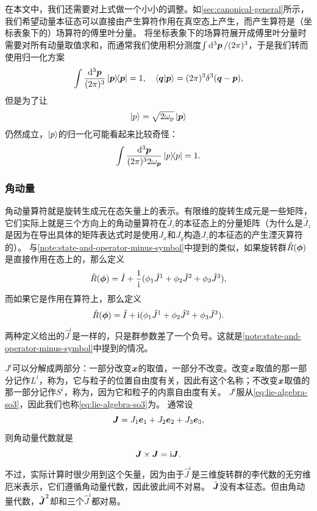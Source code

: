 在本文中，我们还需要对上式做一个小小的调整。如\autoref{sec:canonical-general}所示，我们希望动量本征态可以直接由产生算符作用在真空态上产生，而产生算符是（坐标表象下的）场算符的傅里叶分量。
将坐标表象下的场算符展开成傅里叶分量时需要对所有动量取值求和，而通常我们使用积分测度$\int \dd[3]{\vb*{p}} / (2\pi)^3$，于是我们转而使用归一化方案
\begin{equation}
    \int \frac{\dd[3]{\vb*{p}}}{(2\pi)^3} \dyad{\vb*{p}} = 1, \quad \braket{\vb*{q}}{\vb*{p}} = (2\pi)^3 \delta^3(\vb*{q} - \vb*{p}),
\end{equation}
但是为了让
\begin{equation}
    \ket{p} =  \sqrt{2 \omega_{\text{p}}} \ket{\vb*{p}}
    \label{eq:relativity-p}
\end{equation}
仍然成立，$\ket{p}$的归一化可能看起来比较奇怪：
\begin{equation}
    \int \frac{\dd[3]{\vb*{p}}}{(2\pi)^3 2 \omega_{\vb*{p}}} \dyad{p} = 1.
    \label{eq:strange-p-state}
\end{equation}

\subsubsection{角动量}


角动量算符就是旋转生成元在态矢量上的表示。有限维的旋转生成元是一些矩阵，它们实际上就是三个方向上的角动量算符在$\hat{J}_z$的本征态上的分量矩阵（为什么是$\hat{J}_z$是因为在导出具体的矩阵表达式时是使用$J_x$和$J_y$构造$J_z$的本征态的产生湮灭算符的）。
与\autoref{note:state-and-operator-minus-symbol}中提到的类似，如果旋转群$\hat{R}(\vb*{\phi})$是直接作用在态上的，那么定义
\begin{equation}
    \hat{R}(\vb*{\phi}) = \hat{I} + \frac{1}{\mathrm{i}} (\phi_1 \hat{J}^1 + \phi_2 \hat{J}^2 + \phi_3 \hat{J}^3), 
\end{equation}
而如果它是作用在算符上，那么定义
\[
    \hat{R}(\vb*{\phi}) = \hat{I} + \mathrm{i} (\phi_1 \hat{J}^1 + \phi_2 \hat{J}^2 + \phi_3 \hat{J}^3).
\]
两种定义给出的$\hat{J}^i$是一样的，只是群参数差了一个负号。这就是\autoref{note:state-and-operator-minus-symbol}中提到的情况。

$J^i$可以分解成两部分：一部分改变$\vb*{x}$的取值，一部分不改变。改变$\vb*{x}$取值的那一部分记作$L^i$，称为，它与粒子的位置自由度有关，因此有这个名称；不改变$\vb*{x}$取值的那一部分记作$S^i$，称为，因为它和粒子的内禀自由度有关。
$J^i$服从\eqref{eq:lie-algebra-so3}，因此我们也称\eqref{eq:lie-algebra-so3}为。
通常设
\begin{equation}
    \vb*{J} = J_1 \vb*{e}_1 + J_2 \vb*{e}_2 + J_3 \vb*{e}_3,
\end{equation}
则角动量代数就是
\begin{equation}
    \vb*{J} \times \vb*{J} = \mathrm{i} \vb*{J}.
\end{equation}
不过，实际计算时很少用到这个矢量，因为由于$\hat{J}^i$是三维旋转群的李代数的无穷维厄米表示，它们遵循角动量代数，因此彼此间不对易。
$\hat{\vb*{J}}$没有本征态。但由角动量代数，$\hat{\vb*{J}}^2$却和三个$\hat{J}^i$都对易。

